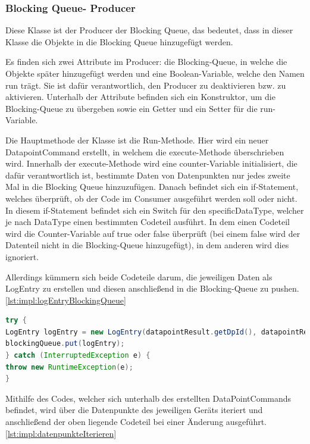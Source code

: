 \subsubsection{Blocking Queue- Producer }
Diese Klasse ist der Producer der Blocking Queue, das bedeutet, dass in dieser Klasse die Objekte in die Blocking Queue hinzugefügt werden.


Es finden sich zwei Attribute im Producer: die Blocking-Queue, in welche die Objekte später hinzugefügt werden und eine Boolean-Variable, welche den Namen \glqq run\grqq{} trägt. Sie ist dafür verantwortlich, den Producer zu deaktivieren bzw. zu aktivieren. Unterhalb der Attribute befinden sich ein Konstruktor, um die Blocking-Queue zu übergeben sowie ein Getter und ein Setter für die run-Variable.


Die Hauptmethode der Klasse ist die Run-Methode. Hier wird ein neuer DatapointCommand erstellt, in welchem die execute-Methode überschrieben wird. Innerhalb der execute-Methode wird eine counter-Variable initialisiert, die dafür verantwortlich ist, bestimmte Daten von Datenpunkten nur jedes zweite Mal in die Blocking Queue hinzuzufügen. Danach befindet sich ein if-Statement, welches überprüft, ob der Code im Consumer ausgeführt werden soll oder nicht. In diesem if-Statement befindet sich ein Switch für den specificDataType, welcher je nach DataType einen bestimmten Codeteil ausführt. In dem einen Codeteil wird die Counter-Variable auf true oder false überprüft (bei einem false wird der Datenteil nicht in die Blocking-Queue hinzugefügt), in dem anderen wird dies ignoriert.


Allerdings kümmern sich beide Codeteile darum, die jeweiligen Daten als LogEntry zu erstellen und diesen anschließend in die Blocking-Queue zu pushen. \ref{lst:impl:logEntryBlockingQueue}


\begin{lstlisting}[language=java,caption=LogEntry in BlockingQueue hinzufügen,label=lst:impl:logEntryBlockingQueue]
try {
LogEntry logEntry = new LogEntry(datapointResult.getDpId(), datapointResult.getValue(), "A", datapointResult.getTimestamp());
blockingQueue.put(logEntry);
} catch (InterruptedException e) {
throw new RuntimeException(e);
}
\end{lstlisting}




Mithilfe des Codes, welcher sich unterhalb des erstellten DataPointCommands befindet, wird über die Datenpunkte des jeweiligen Geräts iteriert und anschließend der oben liegende Codeteil bei einer Änderung ausgeführt. \ref{lst:impl:datenpunkteIterieren}


